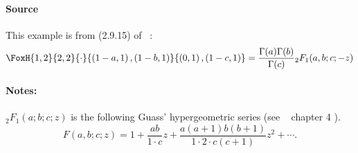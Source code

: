 \paragraph{Source} This example is from (2.9.15) of
~\cite{kilbas.saigo:04:h-transforms}:
\begin{align*}
  \FoxH
    {1,2}
    {2,2}
    {\cdot}
    {\left(1-a, 1\right), \left(1-b, 1\right)}
    {\left(0, 1\right), \left(1-c, 1\right)}=\frac{\Gamma(a)\Gamma(b)}{\Gamma(c)}{}_2F_1(a,b;c;-z)
\end{align*}
\paragraph{Notes:}
${}_2F_1(a;b;c;z)$ is the following Guass' hypergeometric series (see ~\cite{erdelyi.magnus.ea:81:higher*1} chapter 4 ).
$$F(a, b ; c ; z)=1+\frac{a b}{1 \cdot c} z+\frac{a(a+1) b(b+1)}{1 \cdot 2 \cdot c(c+1)} z^2+\cdots .$$

